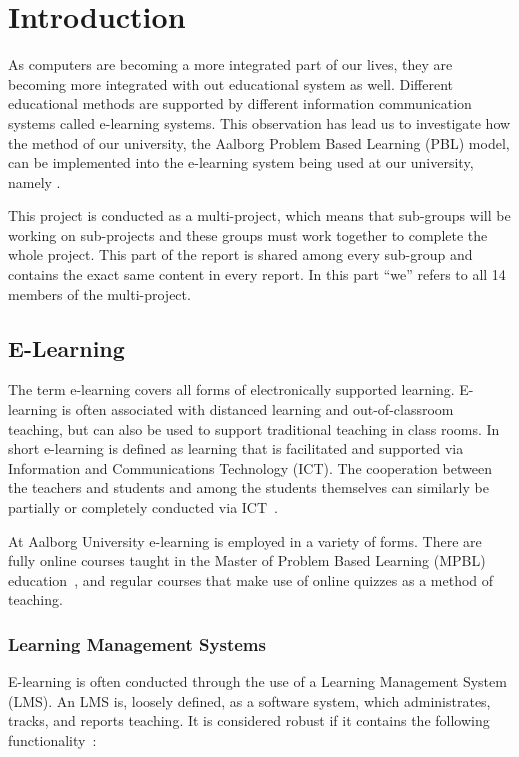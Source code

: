 \chapter{Introduction}
As computers are becoming a more integrated part of our lives, they are becoming more integrated with out educational system as well.
Different educational methods are supported by different information communication systems called e-learning systems.
This observation has lead us to investigate how the method of our university, the Aalborg Problem Based Learning (PBL) model, can be implemented into the e-learning system being used at our university, namely \moodle{}.

This project is conducted as a multi-project, which means that sub-groups will be working on sub-projects and these groups must work together to complete the whole project.
This part of the report is shared among every sub-group and contains the exact same content in every report.
In this part ``we'' refers to all 14 members of the multi-project.

\section{E-Learning}
\label{sec:e-learning}
The term e-learning covers all forms of electronically supported learning. 
E-learning is often associated with distanced learning and out-of-classroom teaching, but can also be used to support traditional teaching in class rooms. 
In short e-learning is defined as learning that is facilitated and supported via Information and Communications Technology (ICT). 
The cooperation between the teachers and students and among the students themselves can similarly be partially or completely conducted via ICT~\cite{def-e-learning1}\cite{def-e-learning2}.

At Aalborg University e-learning is employed in a variety of forms. 
There are fully online courses taught in the Master of Problem Based Learning (MPBL) education~\cite{mpbl}, and regular courses that make use of online quizzes as a method of teaching.

\subsection{Learning Management Systems}
\label{sub:lms}
E-learning is often conducted through the use of a Learning Management System (LMS). 
An LMS is, loosely defined, as a software system, which administrates, tracks, and reports teaching. 
It is considered robust if it contains the following functionality~\citep{Ellis09}:

